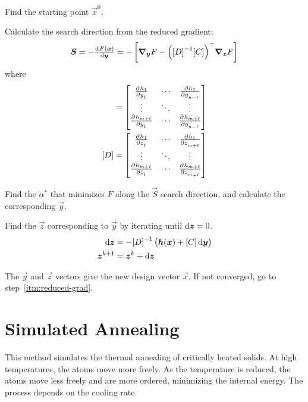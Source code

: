 \documentclass{article}
\begin{document}
\begin{enumerate*}
\item Find the starting point \(\vec{x}^0\).
\item \label{itm:reduced-grad} Calculate the search direction from the reduced gradient:
  \[\vec{S} = -\od{F(\vec{x})}{\vec{y}} = -\left[\del_{\vec{y}}F - \transpose{\left({[D]}^{-1} [C]\right)} \del_{\vec{z}} F\right]\]
  where
  \begin{align*}
    [C] &= \begin{bmatrix}
      \pd{h_1}{y_1} & \cdots & \pd{h_1}{y_{n-\ell}} \\
      \vdots & \ddots & \vdots \\
      \pd{h_{m+\ell}}{y_1} & \cdots & \pd{h_{m+\ell}}{y_{n - \ell}} \\
    \end{bmatrix} \\
    [D] &= \begin{bmatrix}
      \pd{h_1}{z_1} & \cdots & \pd{h_1}{z_{m+\ell}} \\
      \vdots & \ddots & \vdots \\
      \pd{h_{m+\ell}}{z_1} & \cdots & \pd{h_{m+\ell}}{z_{m+\ell}} \\
    \end{bmatrix}
  \end{align*}
\item Find the \(\alpha^*\) that minimizes \(F\) along the \(\vec{S}\) search direction, and calculate the corresponding \(\vec{y}\).
\item Find the \(\vec{z}\) corresponding to \(\vec{y}\) by iterating until \(\dif{\vec{z}} = 0\).
  \begin{align*}
    \dif{\vec{z}} &= -{[D]}^{-1}\left(\vec{h}(\vec{x}) + [C]\dif{\vec{y}}\right) \\
    \vec{z}^{k+1} &= \vec{z}^k + \dif{\vec{z}}
  \end{align*}
\item The \(\vec{y}\) and \(\vec{z}\) vectors give the new design vector \(\vec{x}\).
  If not converged, go to step~\ref{itm:reduced-grad}.
\end{enumerate*}

\section{Simulated Annealing}

This method simulates the thermal annealing of critically heated solids. At high
temperatures, the atoms move more freely. As the temperature is reduced, the
atoms move less freely and are more ordered, minimizing the internal energy. The
process depends on the cooling rate.
\end{document}
